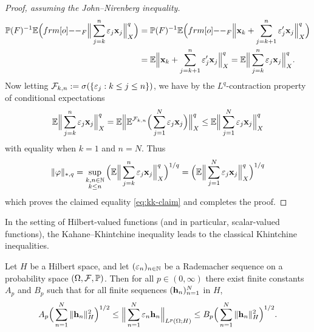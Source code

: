 \begin{proof}[Proof, assuming the John--Nirenberg inequality]
\begin{equation*}
\begin{aligned}
      \P(F)^{-1} \E \Big( \1_{F} \Big\| \sum_{j=k}^{n} \varepsilon_j \mb{x}_j\Big\|_{X}^q \Big)
      &=  \P(F)^{-1} \E \Big( \1_{F} \Big\|\mb{x}_k + \sum_{j=k+1}^{n} \varepsilon_{j}^{\prime} \mb{x}_j \Big\|_{X}^{q} \Big) \\
      &=  \E \Big\|\mb{x}_k + \sum_{j=k+1}^{n} \varepsilon_{j}^{\prime} \mb{x}_j \Big\|_{X}^{q} 
      =  \E  \Big\|\sum_{j=k}^{n} \varepsilon_{j} \mb{x}_j \Big\|_{X}^{q}. \\
    \end{aligned}
  \end{equation*}
  Now letting $\mathcal{F}_{k,n} := \sigma(\{\varepsilon_j : k \leq j \leq n\})$, we have by the $L^q$-contraction property of conditional expectations
  \begin{equation*}
    \mathbb{E} \Big\|\sum_{j=k}^{n} \varepsilon_{j} \mathbf{x}_j \Big\|_{X}^{q}
    = \mathbb{E} \Big\|\mathbb{E}^{\mathcal{F}_{k,n}} \Big(\sum_{j=1}^{N} \varepsilon_{j} \mathbf{x}_j \Big)\Big\|_{X}^{q}
    \leq \mathbb{E} \Big\|\sum_{j=1}^{N} \varepsilon_{j} \mathbf{x}_j \Big\|_{X}^{q}
  \end{equation*}
  with equality when $k=1$ and $n=N$.
  Thus
  \begin{equation*}
    \|\varphi\|_{*,q} =  \sup_{\substack{k,n \in \mathbb{N} \\ k \leq n}}  \Big(\mathbb{E}  \Big\|\sum_{j=k}^{n} \varepsilon_{j} \mathbf{x}_j \Big\|_{X}^{q}\Big)^{1/q} = \Big(\mathbb{E}  \Big\|\sum_{j=1}^{N} \varepsilon_{j} \mathbf{x}_j \Big\|_{X}^{q}\Big)^{1/q}
  \end{equation*}
  which proves the claimed equality \eqref{eq:kk-claim} and completes the proof. %
\end{proof}

In the setting of Hilbert-valued functions (and in particular, scalar-valued functions), the Kahane--Khintchine inequality leads to the classical Khintchine inequalities.

\begin{cor}
  Let $H$ be a Hilbert space, and let $(\varepsilon_{n})_{n \in \mathbb{N}}$ be a Rademacher sequence on a probability space $(\Omega, \mathcal{F}, \mathbb{P})$.
  Then for all $p \in (0,\infty)$ there exist finite constants $A_p$ and $B_p$ such that for all finite sequences $(\mathbf{h}_n)_{n=1}^N$ in $H$,
  \begin{equation*}
    A_p \Big( \sum_{n=1}^N \|\mathbf{h}_n\|_H^2 \Big)^{1/2} \leq \Big\| \sum_{n=1}^N \varepsilon_n \mathbf{h}_n \Big\|_{L^p(\Omega;H)} \leq B_p \Big( \sum_{n=1}^N \|\mathbf{h}_n\|_H^2 \Big)^{1/2}.
  \end{equation*}
\end{cor}

